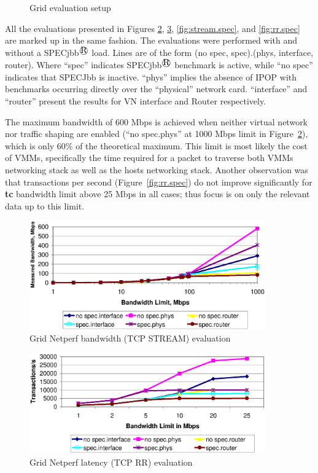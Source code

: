 \begin{figure}
\centering
{}
\caption{Grid evaluation setup}
\label{fig:gridsetup}
\end{figure}

All the evaluations presented in Figures \ref{fig:stream.netperf},
\ref{fig:rr.netperf}, \ref{fig:stream.spec}, and \ref{fig:rr.spec} are marked
up in the same fashion.  The evaluations were performed with and without a
SPECjbb$^\registered$ load.  Lines are of the form (no spec, spec).(phys,
interface, router).  Where ``spec'' indicates SPECjbb$^\registered$ benchmark
is active, while ``no spec'' indicates that SPECJbb is inactive. ``phys''
implies the absence of IPOP with benchmarks occurring directly over the
``physical'' network card.  ``interface'' and ``router'' present the results
for VN interface and Router respectively.

The maximum bandwidth of 600 Mbps is achieved when neither virtual network nor
traffic shaping are enabled (``no spec.phys'' at 1000 Mbps limit in
Figure~\ref{fig:stream.netperf}), which is only 60\% of the theoretical
maximum.  This limit is most likely the cost of VMMs, specifically the time
required for a packet to traverse both VMMs networking stack as well as the
hosts networking stack.  Another observation was that transactions per second
(Figure~\ref{fig:rr.spec}) do not improve significantly for \textbf{tc}
bandwidth limit above 25 Mbps in all cases; thus focus is on only the relevant
data up to this limit.

\begin{figure}
\centering
\includegraphics[width=4in]{figs/stream.netperf.jpg.eps}
\caption{Grid Netperf bandwidth (TCP STREAM) evaluation}
\label{fig:stream.netperf}
\end{figure}

\begin{figure}
\centering
\includegraphics[width=4in]{figs/rr.netperf.jpg.eps}
\caption{Grid Netperf latency (TCP RR) evaluation}
\label{fig:rr.netperf}
\end{figure}


